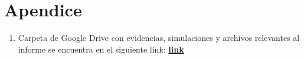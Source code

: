 \section{Apendice}
\begin{enumerate}
    \item Carpeta de Google Drive con evidencias, simulaciones y archivos relevantes al informe se encuentra en el siguiente link: \href{https://drive.google.com/drive/folders/1urglx7gSEKhbGuTpEY-z4wKpvm9DVZBm?usp=sharing}{\textbf{link}}
\end{enumerate}